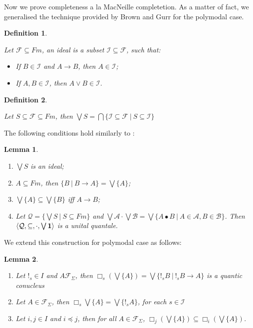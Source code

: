 \documentclass[a4paper]{article}
\theoremstyle{defin}
\newtheorem{defin}{Definition}
\theoremstyle{theorem}
\theoremstyle{prop}
\theoremstyle{lemma}
\newtheorem{lemma}{Lemma}
\theoremstyle{ex}
\theoremstyle{col}
\begin{document}
Now we prove completeness a la MacNeille completetion. As a matter of fact, we generalised the technique provided by Brown and Gurr for the polymodal case.

\begin{defin}
$ $

  Let $\mathcal{F} \subseteq Fm$, an ideal is a subset $\mathcal{I} \subseteq \mathcal{F}$, such that:

\begin{itemize}
  \item If $B \in \mathcal{I}$ and $A \rightarrow B$, then $A \in \mathcal{I}$;
  \item If $A, B \in \mathcal{I}$, then $A \lor B \in \mathcal{I}$.
\end{itemize}
\end{defin}

\begin{defin}
$ $

  Let $S \subseteq \mathcal{F} \subseteq Fm$,
  then $\bigvee S = \bigcap \{ \mathcal{I} \subseteq \mathcal{F} \: | \: S \subseteq \mathcal{I} \}$
\end{defin}

The following conditions hold similarly to \cite{Gurr}:

\begin{lemma}
$ $

  \begin{enumerate}
  \item $\bigvee S$ is an ideal;
  \item $A \subseteq Fm$, then $\{ B \: | \: B \rightarrow A \} = \bigvee \{ A \}$;
  \item $\bigvee \{ A \} \subseteq \bigvee \{ B \}$ iff $A \rightarrow B$;
  \item Let $\mathcal{Q} = \{ \bigvee S \: | \: S \subseteq Fm \}$ and $\bigvee \mathcal{A} \cdot \bigvee \mathcal{B} =
  \bigvee \{ A \bullet B \: | \: A \in \mathcal{A}, B \in \mathcal{B} \}$.
  Then $\langle \mathcal{Q}, \subseteq, \cdot, \bigvee{{\bf 1}}\rangle$ is a unital quantale.
  \end{enumerate}
\end{lemma}

We extend this construction for polymodal case as follows:

\begin{lemma}
  $ $

\begin{enumerate}
\item Let $!_s \in I$ and $A \mathcal{F}_{\Sigma}$, then $\Box_s (\bigvee \{ A \}) = \bigvee \{ !_s B \: | \: !_s B \rightarrow A \}$ is a quantic conucleus
\item Let $A \in \mathcal{F}_{\Sigma}$, then $\Box_s \bigvee \{ A \} = \bigvee \{ !_s A \}$, for each $s \in \mathcal{I}$
\item  Let $i, j \in I$ and $i \preceq j$, then for all $A \in \mathcal{F}_{\Sigma}$, $\Box_j (\bigvee \{ A \}) \subseteq \Box_i (\bigvee \{ A \})$.
\end{enumerate}

\end{lemma}
\end{document}
